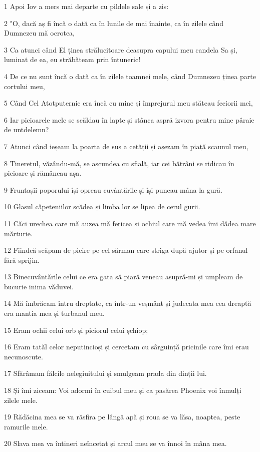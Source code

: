 \par 1 Apoi Iov a mers mai departe cu pildele sale și a zis:
\par 2 "O, dacă aș fi încă o dată ca în lunile de mai înainte, ca în zilele când Dumnezeu mă ocrotea,
\par 3 Ca atunci când El ținea strălucitoare deasupra capului meu candela Sa și, luminat de ea, eu străbăteam prin întuneric!
\par 4 De ce nu sunt încă o dată ca în zilele toamnei mele, când Dumnezeu ținea parte cortului meu,
\par 5 Când Cel Atotputernic era încă cu mine și împrejurul meu stăteau feciorii mei,
\par 6 Iar picioarele mele se scăldau în lapte și stânca aspră izvora pentru mine pâraie de untdelemn?
\par 7 Atunci când ieșeam la poarta de sus a cetății și așezam în piață scaunul meu,
\par 8 Tineretul, văzându-mă, se ascundea cu sfială, iar cei bătrâni se ridicau în picioare și rămâneau așa.
\par 9 Fruntașii poporului își opreau cuvântările și își puneau mâna la gură.
\par 10 Glasul căpeteniilor scădea și limba lor se lipea de cerul gurii.
\par 11 Căci urechea care mă auzea mă fericea și ochiul care mă vedea îmi dădea mare mărturie.
\par 12 Fiindcă scăpam de pieire pe cel sărman care striga după ajutor și pe orfanul fără sprijin.
\par 13 Binecuvântările celui ce era gata să piară veneau asupră-mi și umpleam de bucurie inima văduvei.
\par 14 Mă îmbrăcam întru dreptate, ca într-un veșmânt și judecata mea cea dreaptă era mantia mea și turbanul meu.
\par 15 Eram ochii celui orb și piciorul celui șchiop;
\par 16 Eram tatăl celor neputincioși și cercetam cu sârguință pricinile care îmi erau necunoscute.
\par 17 Sfărâmam fălcile nelegiuitului și smulgeam prada din dinții lui.
\par 18 Și îmi ziceam: Voi adormi în cuibul meu și ca pasărea Phoenix voi înmulți zilele mele.
\par 19 Rădăcina mea se va răsfira pe lângă apă și roua se va lăsa, noaptea, peste ramurile mele.
\par 20 Slava mea va întineri neîncetat și arcul meu se va înnoi în mâna mea.
